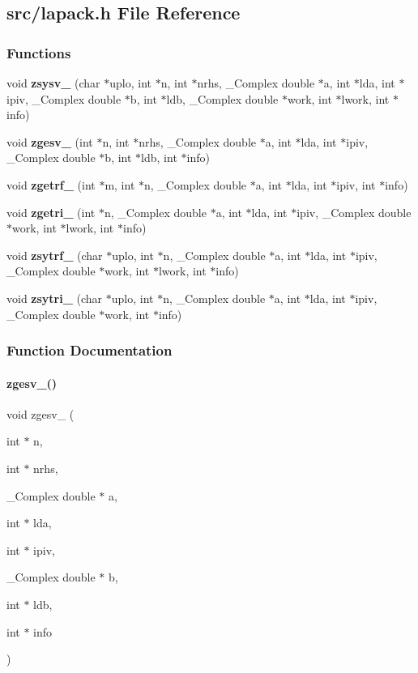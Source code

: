 \subsection{src/lapack.h File Reference}
\label{lapack_8h}
\subsubsection*{Functions}
\begin{DoxyCompactItemize}
\item 
void \textbf{ zsysv\+\_\+} (char $\ast$uplo, int $\ast$n, int $\ast$nrhs, \+\_\+\+Complex double $\ast$a, int $\ast$lda, int $\ast$ipiv, \+\_\+\+Complex double $\ast$b, int $\ast$ldb, \+\_\+\+Complex double $\ast$work, int $\ast$lwork, int $\ast$info)
\item 
void \textbf{ zgesv\+\_\+} (int $\ast$n, int $\ast$nrhs, \+\_\+\+Complex double $\ast$a, int $\ast$lda, int $\ast$ipiv, \+\_\+\+Complex double $\ast$b, int $\ast$ldb, int $\ast$info)
\item 
void \textbf{ zgetrf\+\_\+} (int $\ast$m, int $\ast$n, \+\_\+\+Complex double $\ast$a, int $\ast$lda, int $\ast$ipiv, int $\ast$info)
\item 
void \textbf{ zgetri\+\_\+} (int $\ast$n, \+\_\+\+Complex double $\ast$a, int $\ast$lda, int $\ast$ipiv, \+\_\+\+Complex double $\ast$work, int $\ast$lwork, int $\ast$info)
\item 
void \textbf{ zsytrf\+\_\+} (char $\ast$uplo, int $\ast$n, \+\_\+\+Complex double $\ast$a, int $\ast$lda, int $\ast$ipiv, \+\_\+\+Complex double $\ast$work, int $\ast$lwork, int $\ast$info)
\item 
void \textbf{ zsytri\+\_\+} (char $\ast$uplo, int $\ast$n, \+\_\+\+Complex double $\ast$a, int $\ast$lda, int $\ast$ipiv, \+\_\+\+Complex double $\ast$work, int $\ast$info)
\end{DoxyCompactItemize}


\subsubsection{Function Documentation}
\mbox{\label{lapack_8h_a95e2fd44ba94a6e0cadb86df3aaa62f3}} 
\paragraph{zgesv\_()}
{\footnotesize\ttfamily void zgesv\+\_\+ (\begin{DoxyParamCaption}\item[{int $\ast$}]{n,  }\item[{int $\ast$}]{nrhs,  }\item[{\+\_\+\+Complex double $\ast$}]{a,  }\item[{int $\ast$}]{lda,  }\item[{int $\ast$}]{ipiv,  }\item[{\+\_\+\+Complex double $\ast$}]{b,  }\item[{int $\ast$}]{ldb,  }\item[{int $\ast$}]{info }\end{DoxyParamCaption})}

